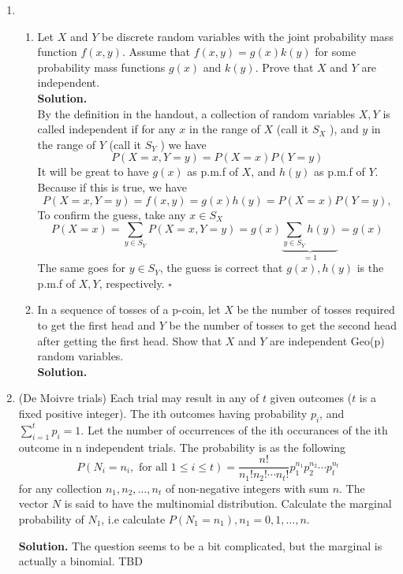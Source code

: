 \documentclass[12pt]{article}
\begin{document}
\begin{enumerate}
\item
\begin{enumerate}
\item
Let $X$ and $Y$ be discrete random variables with the joint probability mass function $f(x,y)$. Assume that $f(x,y)=g(x)k(y)$ for some
probability mass functions $g(x)$ and $k(y)$. Prove that $X$ and $Y$ are independent.\\
\textbf{Solution.}\\ 
By the definition in the handout, a collection of random variables \(X,Y \) is called independent if for any \(x\) in the range of \(X\) (call it \(S_X\) ), and \(y\) in the range of \(Y\) (call it \(S_Y\) ) we have
\[
    P(X =x, Y = y) = P(X = x)P(Y = y)
\]
It will be great to have \(g(x)\) as p.m.f of \(X\), and \(h(y)\) as p.m.f of \(Y\). Because if this is true, we have 
\[
    P(X = x, Y = y) = f(x,y) = g(x)h(y) = P(X= x)P(Y = y),
\] 
To confirm the guess, take any \(x\in S_X\)
\[
    P(X = x) =  \sum_{y\in S_Y}P(X =x, Y = y) = g(x) \underbrace{\sum_{y\in S_Y}h(y) }_{=1} = g(x)
\]  
The same goes for \(y\in S_Y\), the guess is correct that \(g(x), h(y)\) is the p.m.f of \(X, Y\), respectively. \(\square\)  

\item In a sequence of tosses of a p-coin, let $X$ be the number of tosses required to get the first head and $Y$ be the number of tosses to get the second head after getting the first head. Show that $X$ and $Y$ are independent Geo(p) random variables.\\
\textbf{Solution.}  
\end{enumerate}

\item
(De Moivre trials) Each trial may result in any of \(t\) given outcomes (\(t\) is a fixed positive integer). The ith outcomes having probability \(p_i\), and \(\sum_{i=1}^{t} p_i  = 1\).
Let the number of occurrences of the ith occurances of the ith outcome in n independent trials. The probability is as the following
\[
    P(N_i = n_i, \text{ for all } 1 \leq i \leq t) = \frac{n!}{n_1!n_2!\cdots n_t!}p_1^{n_1}p_2^{n_2} \cdots p_t^{n_t}
\]
for any collection \(n_1, n_2, \dots, n_t\) of non-negative integers with sum \(n\). The vector \(N\) is said to have the multinomial distribution.
Calculate the marginal probability of \(N_1\), i.e calculate \(P(N_1 = n_1), n_1 = 0,1,\dots,n\).

\textbf{Solution.} The question seems to be a bit complicated, but the marginal is actually a binomial. 
TBD


\end{enumerate}
\end{document}
